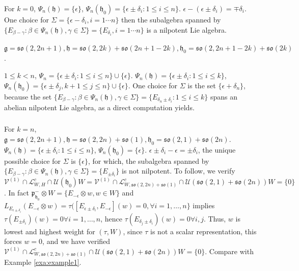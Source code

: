 \documentclass[12pt]{amsart}
\theoremstyle{definition}
\theoremstyle{remark}
\newcommand{\g}{\mathfrak{g}}
\newcommand{\h}{\mathfrak{h}}
\newcommand{\p}{\mathfrak p}
\numberwithin{equation}{section}
\begin{document}
For $k=0$, $\Psi_n(\h)=\{\epsilon \}  $, $\Psi_n(\h_0)= \{ \epsilon \pm \delta_i  :  1 \leq i\leq n \} $. $\epsilon-(\epsilon \pm \delta_i )=\mp \delta_i$. One choice for $\Sigma=\{ \epsilon -\delta_i, i=1\cdots n\}$ then the subalgebra spanned by $\{E_{\beta -\gamma} : \beta \in \Psi_n(\h), \gamma \in \Sigma\}= \{  E_{\delta_i}, i=1\cdots n\}$ is a nilpotent Lie algebra.




\smallskip

$\g=\mathfrak{so}(2,2n+1),  \h=\mathfrak{so}(2,2k)+\mathfrak{so}(2n+1-2k), \h_0=\mathfrak{so}(2,2n+1-2k)+\mathfrak{so}(2k)$.

 $ 1 \leq k<n$,  $\Psi_n=\{  \epsilon \pm \delta_i :  1 \leq i \leq n \}\cup \{\epsilon \}$. $\Psi_n(\h)=\{ \epsilon \pm \delta_i  :  1 \leq i\leq k \} $, $\Psi_n(\h_0)=\{ \epsilon \pm \delta_j, k+1 \leq j \leq n  \}\cup \{\epsilon \}$. One  choice  for $\Sigma$ is the set
$  \{ \epsilon +\delta_n \}$,  because the set  $\{E_{\beta -\gamma} : \beta \in \Psi_n(\h), \gamma \in \Sigma\}= \{E_{\delta_n \pm \delta_i} : 1\leq i \leq k \}$ spans an abelian  nilpotent Lie algebra, as a direct computation yields.

\subsubsection{}\label{sub:interequalceronosigma}For $k=n$, $\g=\mathfrak{so}(2,2n+1),  \h=\mathfrak{so}(2,2n)+\mathfrak{so}(1), \h_0=\mathfrak{so}(2, 1 )+\mathfrak{so}(2n)$. $\Psi_n(\h)=\{ \epsilon \pm \delta_i  :  1 \leq i\leq n \} $, $\Psi_n(\h_0)= \{\epsilon \}$. $\epsilon \pm \delta_i-\epsilon=\pm \delta_i$, the unique possible choice for $\Sigma$ is $\{\epsilon \}$, for which, the subalgebra spanned by $\{E_{\beta -\gamma} : \beta \in \Psi_n(\h), \gamma \in \Sigma\}=\{ E_{\pm \delta_i} \}$ is not nilpotent. To follow, we verify $\mathcal V^{(1)}\cap \mathcal L_{W,H}^c \cap \mathcal U(\h_0)W=  \mathcal V^{(1)}\cap \mathcal L_{W, \mathfrak{so}(2,2n)+\mathfrak{so}(1) }^c \cap \mathcal U(\mathfrak{so}(2,1)+\mathfrak{so}(2n))W =\{0\}$. In fact $\p_{\h_0}^- \otimes W=\{ E_{-\epsilon} \otimes w, w\in W \}$ and $L_{E_{\epsilon \pm \delta_i}} (E_{-\epsilon}\otimes w)=\tau([E_{\epsilon \pm \delta_i}, E_{-\epsilon}](w)=0, \forall i=1,\dots,n \}$ implies $\tau(E_{\pm \delta_i})(w)=0 \forall i=1,\dots,n$,  hence $\tau(E_{\delta_j \pm \delta_i})(w)=0 \forall i,j$. Thus, $w$ is lowest and highest weight for $(\tau, W)$, since $\tau$ is not a scalar representation, this forces $w=0$, and we have verified $ \mathcal V^{(1)}\cap \mathcal L_{W, \mathfrak{so}(2,2n)+\mathfrak{so}(1) }^c \cap \mathcal U(\mathfrak{so}(2,1)+\mathfrak{so}(2n))W =\{0\}$. Compare with Example \ref{exa:example1}.
\end{document}
